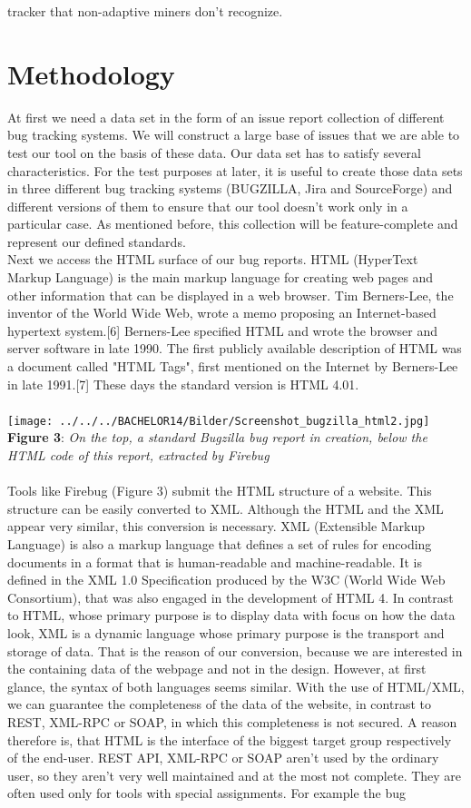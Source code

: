 \documentclass[12pt,a4paper,final]{article}
\begin{document}
tracker that non-adaptive miners don't recognize.


\section{Methodology}
At first we need a data set in the form of an issue report collection of different bug tracking systems. We will construct a large base of issues that we are able to test our tool on the basis of these data. Our data set has to satisfy several characteristics. For the test purposes at later, it is useful to create those data sets in three different bug tracking systems (BUGZILLA, Jira and SourceForge) and different versions of them to ensure that our tool doesn't work only in a particular case. As mentioned before, this collection will be feature-complete and represent our defined standards. \\ Next we access the HTML surface of our bug reports. HTML (HyperText Markup Language) is the main markup language for creating web pages and other information that can be displayed in a web browser. Tim Berners-Lee, the inventor of the World Wide Web, wrote a memo proposing an Internet-based hypertext system.[6] Berners-Lee specified HTML and wrote the browser and server software in late 1990. The first publicly available description of HTML was a document called "HTML Tags", first mentioned on the Internet by Berners-Lee in late 1991.[7] These days the standard version is HTML 4.01. \\ \\\texttt{[image: ../../../BACHELOR14/Bilder/Screenshot\_bugzilla\_html2.jpg]}  \\\textbf{Figure 3}: \textit{On the top, a standard Bugzilla bug report in creation, below the HTML code of this report, extracted by Firebug}  \\ \\Tools like Firebug (Figure 3) submit the HTML structure of a website. This structure can be easily converted to XML. Although the HTML and the XML appear very similar, this conversion is necessary. XML (Extensible Markup Language) is also a markup language that defines a set of rules for encoding documents in a format that is human-readable and machine-readable. It is defined in the XML 1.0 Specification produced by the W3C (World Wide Web Consortium), that was also engaged in the development of HTML 4. In contrast to HTML, whose primary purpose is to display data with focus on how the data look, XML is a dynamic language whose primary purpose is the transport and storage of data. That is the reason of our conversion, because we are interested in the containing data of the webpage and not in the design. However, at first glance, the syntax of both languages seems similar. With the use of HTML/XML, we can guarantee the completeness of the data of the website, in contrast to REST, XML-RPC or SOAP, in which this completeness is not secured. A reason therefore is, that HTML is the interface of the biggest target group respectively of the end-user. REST API, XML-RPC or SOAP aren't used by the ordinary user, so they aren't very well maintained and at the most not complete. They are often used only for tools with special assignments. For example the bug 
\end{document}
